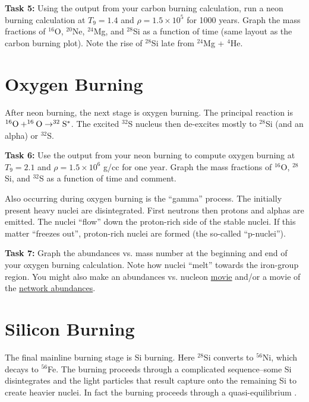 \documentclass[manuscript]{aastex62}
\begin{document}
{\bf Task 5:}
Using the output from your carbon burning calculation, run a neon burning
calculation at $T_9 = 1.4$ and $\rho = 1.5 \times 10^5$ for 1000 years.
Graph the mass fractions of $^{16}$O, $^{20}$Ne, $^{24}$Mg, and $^{28}$Si
as a function of time (same layout as the carbon burning plot).  Note
the rise of $^{28}$Si late from $^{24}$Mg + $^4$He.

\section{Oxygen Burning} \label{sec:O}

After neon burning, the next stage is oxygen burning.  The principal reaction
is $^{16}{\rm O} + ^{16}{\rm O} \to ^{32}{\rm S}^*$.  The excited $^{32}$S
nucleus then de-excites mostly to $^{28}$Si (and an alpha)
or $^{32}$S.

{\bf Task 6:}  Use the output from your neon burning to compute oxygen burning
at $T_9 = 2.1$ and $\rho = 1.5\times 10^6$ g/cc for one year.  Graph the
mass fractions of $^{16}$O, $^{28}$Si, and $^{32}$S as a function of time and
comment.

Also occurring during oxygen burning is the ``gamma'' process.  The initially
present heavy nuclei are disintegrated.  First neutrons then protons and
alphas are emitted.  The nuclei ``flow'' down the proton-rich side of the
stable nuclei.  If this matter ``freezes out'', proton-rich nuclei are
formed (the so-called ``p-nuclei'').

{\bf Task 7:}  Graph the abundances vs. mass number at the beginning and end of
your oxygen burning calculation.  Note how nuclei ``melt'' towards the
iron-group region.  You might also make an abundances vs. nucleon
\href{https://wnutils.readthedocs.io/en/latest/animate_tutorial.html#animating-the-abundances-versus-nucleon-number}{movie} and/or a movie of the
\href{https://wnutils.readthedocs.io/en/latest/animate_tutorial.html#animating-the-network-abundances}{network abundances}.

\section{Silicon Burning} \label{sec:Si}

The final mainline burning stage is Si burning.  Here $^{28}$Si converts to
$^{56}$Ni, which decays to $^{56}$Fe.  The burning proceeds through a
complicated sequence--some Si disintegrates and the light particles that result
capture onto the remaining Si to create heavier nuclei.  In fact the
burning proceeds through a quasi-equilibrium
\cite{1968ApJS...16..299B,1998ApJ...498..808M}.
\end{document}
